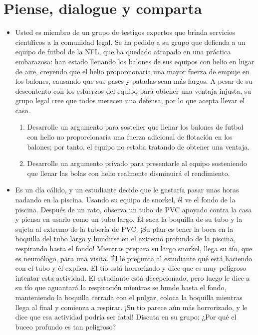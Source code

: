 \documentclass[11pt,a4paper]{article}
\begin{document}
\section*{Piense, dialogue y comparta}

\begin{itemize}
    \item[\textbf{1.}] Usted es miembro de un grupo de testigos expertos que brinda servicios científicos a la comunidad legal. Se ha pedido a su grupo que defienda a un equipo de futbol de la NFL, que ha quedado atrapado en una práctica embarazosa: han estado llenando los balones de sus equipos con helio en lugar de aire, creyendo que el helio proporcionaría una mayor fuerza de empuje en los balones, causando que sus pases y patadas sean más largos. A pesar de su descontento con los esfuerzos del equipo para obtener una ventaja injusta, su grupo legal cree que todos merecen una defensa, por lo que acepta llevar el caso.
    \begin{enumerate}
        \item[\textbf{(a)}] Desarrolle un argumento para sostener que llenar los balones de futbol con helio no proporcionaría una fuerza adicional de flotación en los balones; por tanto, el equipo no estaba tratando de obtener una ventaja.
        \item[\textbf{(b)}] Desarrolle un argumento privado para presentarle al equipo sosteniendo que llenar las bolas con helio realmente disminuirá el rendimiento.
    \end{enumerate}
    \vspace*{9cm}

    \newpage

    \item[\textbf{2.}] Es un día cálido, y un estudiante decide que le gustaría pasar unas horas nadando en la piscina. Usando su equipo de snorkel, él ve el fondo de la piscina. Después de un rato, observa un tubo de PVC apoyado contra la casa y piensa en usarlo como un tubo largo. Él saca la boquilla de su tubo y la sujeta al extremo de la tubería de PVC. ¡Su plan es tener la boca en la boquilla del tubo largo y hundirse en el extremo profundo de la piscina, respirando hasta el fondo! Mientras prepara su largo snorkel, llega su tío, que es neumólogo, para una visita. Él le pregunta al estudiante qué está haciendo con el tubo y él explica. El tío está horrorizado y dice que es muy peligroso intentar esta actividad. El estudiante está decepcionado, pero luego le dice a su tío que aguantará la respiración mientras se hunde hasta el fondo, manteniendo la boquilla cerrada con el pulgar, coloca la boquilla mientras llega al final y comienza a respirar. ¡Su tío parece aún más horrorizado, y le dice que esa actividad podría ser fatal! Discuta en su grupo: ¿Por qué el buceo profundo es tan peligroso?
    \vspace*{9cm}


\end{itemize}
\end{document}
